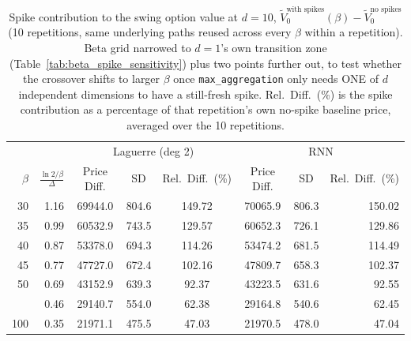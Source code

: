 \begin{table}

\caption{\label{tab:beta_spike_sensitivity_d10}Spike contribution to the swing option value at $d=10$, $\tilde V_0^{\text{with spikes}}(\beta) - \tilde V_0^{\text{no spikes}}$ (10 repetitions, same underlying paths reused across every $\beta$ within a repetition). Beta grid narrowed to $d=1$'s own transition zone (Table~\ref{tab:beta_spike_sensitivity}) plus two points further out, to test whether the crossover shifts to larger $\beta$ once \texttt{max\_aggregation} only needs ONE of $d$ independent dimensions to have a still-fresh spike. Rel.\ Diff.\ (\%) is the spike contribution as a percentage of that repetition's own no-spike baseline price, averaged over the 10 repetitions.}
\footnotesize
\setlength{\tabcolsep}{4pt}
\centering
\begin{tabular}[t]{rrcccccr}
\toprule
\multicolumn{2}{c}{ } & \multicolumn{3}{c}{Laguerre (deg 2)} & \multicolumn{3}{c}{RNN} \\
\cmidrule(l{3pt}r{3pt}){3-5} \cmidrule(l{3pt}r{3pt}){6-8}
$\beta$ & $\frac{\ln 2/\beta}{\Delta}$ & Price Diff. & SD & Rel.\ Diff.\ (\%) & Price Diff. & SD & Rel.\ Diff.\ (\%)\\
\midrule
30 & 1.16 & 69944.0 & 804.6 & 149.72 & 70065.9 & 806.3 & 150.02\\
35 & 0.99 & 60532.9 & 743.5 & 129.57 & 60652.3 & 726.1 & 129.86\\
40 & 0.87 & 53378.0 & 694.3 & 114.26 & 53474.2 & 681.5 & 114.49\\
45 & 0.77 & 47727.0 & 672.4 & 102.16 & 47809.7 & 658.3 & 102.37\\
50 & 0.69 & 43152.9 & 639.3 & 92.37 & 43223.5 & 631.6 & 92.55\\
\addlinespace
75 & 0.46 & 29140.7 & 554.0 & 62.38 & 29164.8 & 540.6 & 62.45\\
100 & 0.35 & 21971.1 & 475.5 & 47.03 & 21970.5 & 478.0 & 47.04\\
\bottomrule
\end{tabular}
\end{table}
